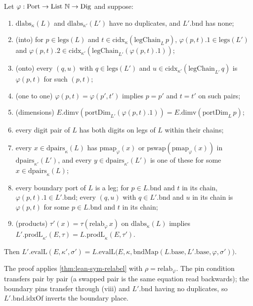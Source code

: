 \begin{theorem}\label{thm:lean-sym-relabelphi}
Let $\varphi:\mathrm{Port}\to\text{List }\mathbb{N}\to\mathrm{Dig}$ and suppose:
\begin{enumerate}[label=(\roman*)]
\item $\mathrm{dlabs}_\kappa(L)$ and $\mathrm{dlabs}_{\kappa'}(L')$ have no duplicates, and $L'.\mathrm{bnd}$ has none;
\item (into) for $p\in\mathrm{legs}(L)$ and $t\in\mathrm{cidx}_\kappa(\mathrm{legChain}_L\,p)$, $\varphi(p,t).1\in\mathrm{legs}(L')$ and $\varphi(p,t).2\in\mathrm{cidx}_{\kappa'}(\mathrm{legChain}_{L'}(\varphi(p,t).1))$;
\item (onto) every $(q,u)$ with $q\in\mathrm{legs}(L')$ and $u\in\mathrm{cidx}_{\kappa'}(\mathrm{legChain}_{L'}\,q)$ is $\varphi(p,t)$ for such $(p,t)$;
\item (one to one) $\varphi(p,t)=\varphi(p',t')$ implies $p=p'$ and $t=t'$ on such pairs;
\item (dimensions) $E.\mathrm{dimv}(\mathrm{portDim}_{L'}(\varphi(p,t).1))=E.\mathrm{dimv}(\mathrm{portDim}_L\,p)$;
\item every digit pair of $L$ has both digits on legs of $L$ within their chains;
\item every $x\in\mathrm{dpairs}_\kappa(L)$ has $\mathrm{pmap}_\varphi(x)$ or $\mathrm{pswap}(\mathrm{pmap}_\varphi(x))$ in $\mathrm{dpairs}_{\kappa'}(L')$, and every $y\in\mathrm{dpairs}_{\kappa'}(L')$ is one of these for some $x\in\mathrm{dpairs}_\kappa(L)$;
\item every boundary port of $L$ is a leg; for $p\in L.\mathrm{bnd}$ and $t$ in its chain, $\varphi(p,t).1\in L'.\mathrm{bnd}$; every $(q,u)$ with $q\in L'.\mathrm{bnd}$ and $u$ in its chain is $\varphi(p,t)$ for some $p\in L.\mathrm{bnd}$ and $t$ in its chain;
\item (products) $\tau'(x)=\tau(\mathrm{relab}_\varphi\,x)$ on $\mathrm{dlabs}_\kappa(L)$ implies $L'.\mathrm{prodL}_{\kappa'}(E,\tau)=L.\mathrm{prodL}_\kappa(E,\tau')$.
\end{enumerate}
Then $L'.\mathrm{evalL}(E,\kappa',\sigma')=L.\mathrm{evalL}\bigl(E,\kappa,\mathrm{bndMap}(L.\mathrm{base},L'.\mathrm{base},\varphi,\sigma')\bigr)$.
\end{theorem}

The proof applies \cref{thm:lean-sym-relabel} with $\rho=\mathrm{relab}_\varphi$. The pin condition transfers pair by pair (a swapped pair is the same equation read backwards); the boundary pins transfer through (viii) and $L'.\mathrm{bnd}$ having no duplicates, so $L'.\mathrm{bnd.idxOf}$ inverts the boundary place.

